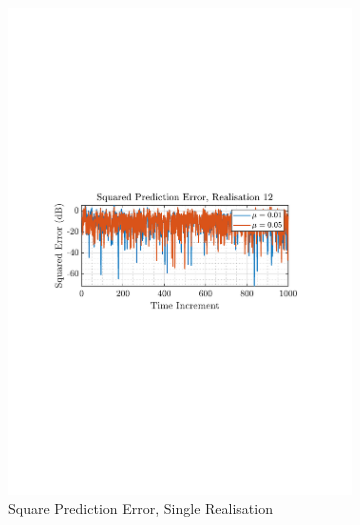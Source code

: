 \documentclass[12pt]{article}
\begin{document}
			\begin{figure}[H]
				\centering
				\begin{subfigure}{0.49\textwidth}
					\centering
					\includegraphics[trim={2.2cm 11.2cm 3.15cm  11.2cm}, clip, width=\textwidth]{../MATLAB/figures/q2_1b_fig01.pdf} 
					\captionsetup{justification=centering}
					\caption{Square Prediction Error, Single Realisation}
				\end{subfigure}
				\begin{subfigure}{0.49\textwidth}
					\centering

\end{subfigure}
\end{figure}
\end{document}
